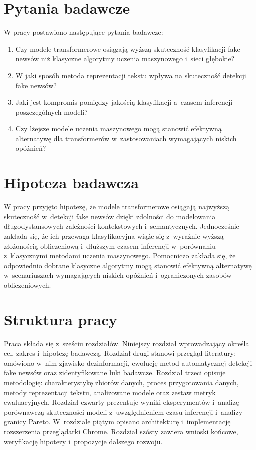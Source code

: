 \documentclass[oneside,polski,logo]{amuthesis}
\begin{document}
\section{Pytania badawcze}
W pracy postawiono następujące pytania badawcze:
\begin{enumerate} 
    \item Czy modele transformerowe osiągają wyższą skuteczność klasyfikacji fake newsów niż klasyczne algorytmy uczenia maszynowego i~sieci głębokie?
    \item W jaki sposób metoda reprezentacji tekstu wpływa na skuteczność detekcji fake newsów?
    \item Jaki jest kompromis pomiędzy jakością klasyfikacji a~czasem inferencji poszczególnych modeli?
    \item Czy lżejsze modele uczenia maszynowego mogą stanowić efektywną alternatywę dla transformerów w~zastosowaniach wymagających niskich opóźnień?
\end{enumerate}

\section{Hipoteza badawcza}
W pracy przyjęto hipotezę, że modele transformerowe osiągają najwyższą skuteczność w~detekcji fake newsów dzięki zdolności do modelowania długodystansowych zależności kontekstowych i~semantycznych. Jednocześnie zakłada się, że ich przewaga klasyfikacyjna wiąże się z~wyraźnie wyższą złożonością obliczeniową i~dłuższym czasem inferencji w~porównaniu z~klasycznymi metodami uczenia maszynowego. Pomocniczo zakłada się, że odpowiednio dobrane klasyczne algorytmy mogą stanowić efektywną alternatywę w~scenariuszach wymagających niskich opóźnień i~ograniczonych zasobów obliczeniowych.

\section{Struktura pracy}
Praca składa się z~sześciu rozdziałów. Niniejszy rozdział wprowadzający określa cel, zakres i~hipotezę badawczą. Rozdział drugi stanowi przegląd literatury: omówiono w~nim zjawisko dezinformacji, ewolucję metod automatycznej detekcji fake newsów oraz zidentyfikowane luki badawcze. Rozdział trzeci opisuje metodologię: charakterystykę zbiorów danych, proces przygotowania danych, metody reprezentacji tekstu, analizowane modele oraz zestaw metryk ewaluacyjnych. Rozdział czwarty prezentuje wyniki eksperymentów i~analizę porównawczą skuteczności modeli z~uwzględnieniem czasu inferencji i~analizy granicy Pareto. W~rozdziale piątym opisano architekturę i~implementację rozszerzenia przeglądarki Chrome. Rozdział szósty zawiera wnioski końcowe, weryfikację hipotezy i~propozycje dalszego rozwoju.
\end{document}
